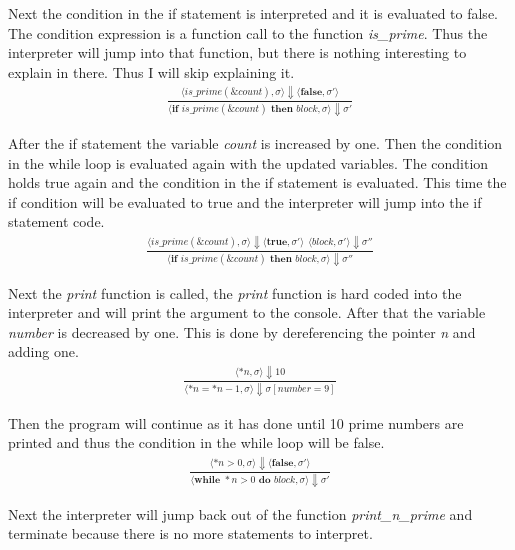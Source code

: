 \documentclass[12pt]{article}
\begin{document}
	Next the condition in the if statement is interpreted and it is evaluated to false. The condition expression is a function call to the function \emph{is\_prime}. Thus the interpreter will jump into that function, but there is nothing interesting to explain in there. Thus I will skip explaining it.
	\begin{align*}
		\frac{\langle is\_prime(\&count), \sigma \rangle\Downarrow \langle \textbf{false}, \sigma' \rangle}
		{\langle \textbf{if } is\_prime(\&count) \textbf{ then } block, \sigma \rangle\Downarrow \sigma'}
	\end{align*}

	After the if statement the variable \emph{count} is increased by one. Then the condition in the while loop is evaluated again with the updated variables. The condition holds true again and the condition in the if statement is evaluated. This time the if condition will be evaluated to true and the interpreter will jump into the if statement code.
	\begin{align*}
		\frac{\langle is\_prime(\&count), \sigma \rangle\Downarrow \langle \textbf{true}, \sigma' \rangle \ \
		\langle block, \sigma' \rangle\Downarrow \sigma''}
		{\langle \textbf{if } is\_prime(\&count) \textbf{ then } block, \sigma \rangle\Downarrow \sigma''}
	\end{align*}

	Next the \emph{print} function is called, the \emph{print} function is hard coded into the interpreter and will print the argument to the console. After that the variable \emph{number} is decreased by one. This is done by dereferencing the pointer \emph{n} and adding one.
	\begin{align*}
		\frac{\langle *n, \sigma \rangle\Downarrow 10}
		{\langle *n = *n - 1, \sigma \rangle\Downarrow \sigma[number = 9]}
	\end{align*}
	
	Then the program will continue as it has done until 10 prime numbers are printed and thus the condition in the while loop will be false.
	\begin{align*}
		\frac{\langle *n > 0, \sigma \rangle\Downarrow \langle \textbf{false}, \sigma' \rangle}
		{\langle \textbf{while } *n > 0 \textbf{ do } block, \sigma \rangle\Downarrow \sigma'}
	\end{align*}

	Next the interpreter will jump back out of the function \emph{print\_n\_prime} and terminate because there is no more statements to interpret.
\end{document}

